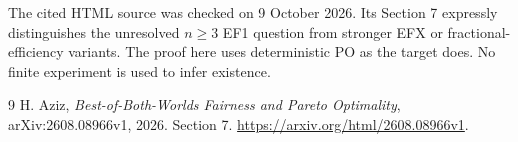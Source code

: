 \documentclass[11pt]{article}
\theoremstyle{definition}
\begin{document}
The cited HTML source was checked on 9 October 2026. Its Section 7 expressly
distinguishes the unresolved $n\ge3$ EF1 question from stronger EFX or
fractional-efficiency variants. The proof here uses deterministic PO as
the target does. No finite experiment is used to infer existence.
\begin{thebibliography}{9}
 H. Aziz, \emph{Best-of-Both-Worlds Fairness and Pareto
Optimality}, arXiv:2608.08966v1, 2026. Section 7.
\url{https://arxiv.org/html/2608.08966v1}.
\end{thebibliography}
\end{document}
